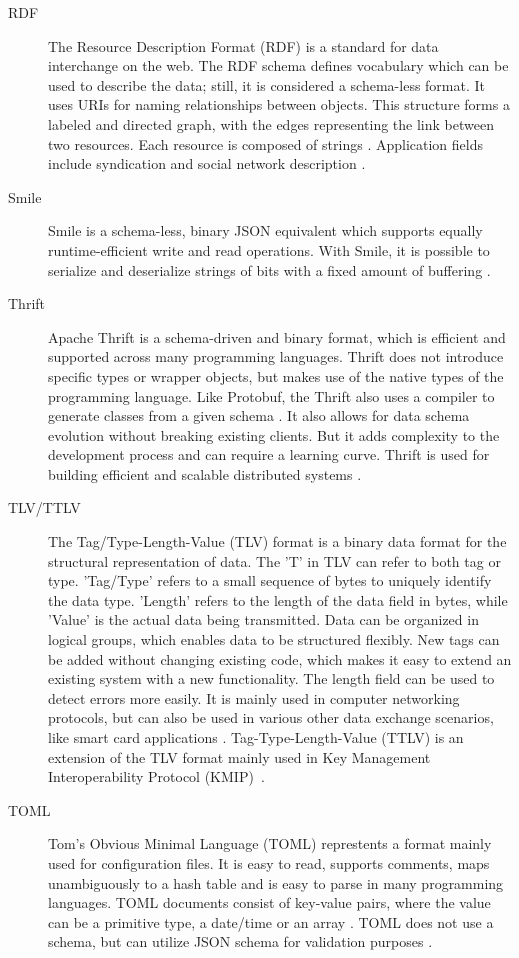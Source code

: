 \documentclass[10pt]{IEEEtran}
\begin{document}
\begin{description}
    \item[RDF] The Resource Description Format (RDF) is a standard for data interchange on the web. The RDF schema defines vocabulary which can be used to describe the data; still, it is considered a schema-less format. It uses URIs for naming relationships between objects. This structure forms a labeled and directed graph, with the edges representing the link between two resources. Each resource is composed of strings \cite{w3c_2024}. Application fields include syndication and social network description \cite{prudhommeaux_2003}. 
    \item[Smile]  Smile is a schema-less, binary JSON equivalent which supports equally runtime-efficient write and read operations. With Smile, it is possible to serialize and deserialize strings of bits with a fixed amount of buffering \cite{viotti_2022}. 
    \item[Thrift]  Apache Thrift is a schema-driven and binary format, which is efficient and supported across many programming languages. Thrift does not introduce specific types or wrapper objects, but makes use of the native types of the programming language. Like Protobuf, the Thrift also uses a compiler to generate classes from a given schema \cite{viotti_2022}. It also allows for data schema evolution without breaking existing clients. But it adds complexity to the development process and can require a learning curve. Thrift is used for building efficient and scalable distributed systems \cite{klimenko_2024}. 
    \item[TLV/TTLV] The Tag/Type-Length-Value (TLV) format is a binary data format for the structural representation of data. The 'T' in TLV can refer to both tag or type. 'Tag/Type' refers to a small sequence of bytes to uniquely identify the data type. 'Length' refers to the length of the data field in bytes, while 'Value' is the actual data being transmitted. Data can be organized in logical groups, which enables data to be structured flexibly. New tags can be added without changing existing code, which makes it easy to extend an existing system with a new functionality. The length field can be used to detect errors more easily. It is mainly used in computer networking protocols, but can also be used in various other data exchange scenarios, like smart card applications \cite{devopedia_tlv_2023}. Tag-Type-Length-Value (TTLV) is an extension of the TLV format mainly used in Key Management Interoperability Protocol (KMIP)~\cite{oasis_2019}.
    \item[TOML]  Tom's Obvious Minimal Language (TOML) represtents a format mainly used for configuration files. It is easy to read, supports comments, maps unambiguously to a hash table and is easy to parse in many programming languages. TOML documents consist of key-value pairs, where the value can be a primitive type, a date/time or an array \cite{preston-werner_2021}. TOML does not use a schema, but can utilize JSON schema for validation purposes \cite{jsonschema_2018}.

\end{description}
\end{document}
